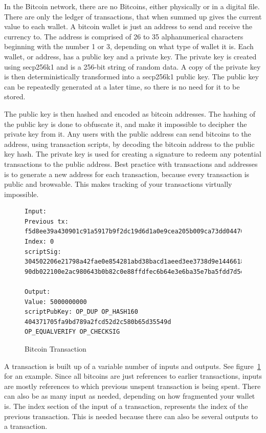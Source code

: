 \documentclass[11pt]{article}
\begin{document}
In the Bitcoin network, there are no Bitcoins, either physically or in a digital file. There are only the ledger of transactions, that when summed up gives the current value to each wallet. A bitcoin wallet is just an address to send and receive the currency to. The address is comprised of 26 to 35 alphanumerical characters beginning with the number 1 or 3, depending on what type of wallet it is. Each wallet, or address, has a public key and a private key. The private key is created using secp256k1\cite{sigalg} and is a 256-bit string of random data. A copy of the private key is then deterministically transformed into a secp256k1 public key. The public key can be repeatedly generated at a later time, so there is no need for it to be stored. 

The public key is then hashed and encoded as bitcoin addresses. The hashing of the public key is done to obfuscate it, and make it impossible to decipher the private key from it. Any users with the public address can send bitcoins to the address, using transaction scripts, by decoding the bitcoin address to the public key hash. The private key is used for creating a signature to redeem any potential transactions to the public address. Best practice with transactions and addresses is to generate a new address for each transaction, because every transaction is public and browsable. This makes tracking of your transactions virtually impossible. 

\begin{figure}[h!]
	\centering
	\begin{lstlisting}[breaklines, basicstyle=\tiny]
Input:
Previous tx: f5d8ee39a430901c91a5917b9f2dc19d6d1a0e9cea205b009ca73dd04470b9a6
Index: 0
scriptSig: 304502206e21798a42fae0e854281abd38bacd1aeed3ee3738d9e1446618c4571d10
90db022100e2ac980643b0b82c0e88ffdfec6b64e3e6ba35e7ba5fdd7d5d6cc8d25c6b241501

Output:
Value: 5000000000
scriptPubKey: OP_DUP OP_HASH160 404371705fa9bd789a2fcd52d2c580b65d35549d
OP_EQUALVERIFY OP_CHECKSIG
	\end{lstlisting}
	\caption{Bitcoin Transaction}
	\label{fig:transaction}
\end{figure}

A transaction is built up of a variable number of inputs and outputs. See figure~\ref{fig:transaction}  for an example. Since all bitcoins are just references to earlier transactions, inputs are mostly references to which previous unspent transaction is being spent. There can also be as many input as needed, depending on how fragmented your wallet is. The index section of the input of a transaction, represents the index of the previous transaction. This is needed because there can also be several outputs to a transaction.
\end{document}
